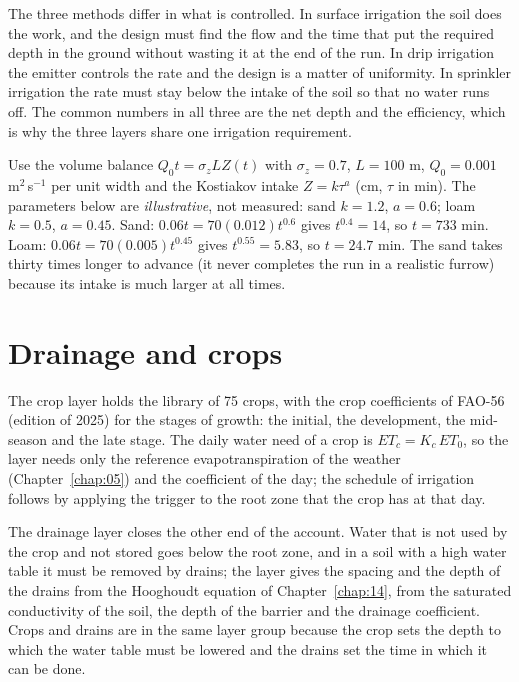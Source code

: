 The three methods differ in what is controlled. In surface irrigation the soil does the work, and the design must find the flow and the time that put the required depth in the ground without wasting it at the end of the run. In drip irrigation the emitter controls the rate and the design is a matter of uniformity. In sprinkler irrigation the rate must stay below the intake of the soil so that no water runs off. The common numbers in all three are the net depth and the efficiency, which is why the three layers share one irrigation requirement.

\sol  Use the volume balance $Q_0t=\sigma_zLZ(t)$ with $\sigma_z=0.7$, $L=100$ m, $Q_0=0.001$ m$^2$\,s$^{-1}$ per unit width and the Kostiakov intake $Z=k\tau^a$ (cm, $\tau$ in min). The parameters below are \emph{illustrative}, not measured: sand $k=1.2$, $a=0.6$; loam $k=0.5$, $a=0.45$. Sand: $0.06t=70(0.012)t^{0.6}$ gives $t^{0.4}=14$, so $t=733$ min. Loam: $0.06t=70(0.005)t^{0.45}$ gives $t^{0.55}=5.83$, so $t=24.7$ min. The sand takes thirty times longer to advance (it never completes the run in a realistic furrow) because its intake is much larger at all times. \finans


\section{Drainage and crops}
The crop layer holds the library of 75 crops, with the crop coefficients of FAO-56 (edition of 2025) for the stages of growth: the initial, the development, the mid-season and the late stage. The daily water need of a crop is $ET_c=K_c\,ET_0$, so the layer needs only the reference evapotranspiration of the weather (Chapter~\ref{chap:05}) and the coefficient of the day; the schedule of irrigation follows by applying the trigger to the root zone that the crop has at that day.

The drainage layer closes the other end of the account. Water that is not used by the crop and not stored goes below the root zone, and in a soil with a high water table it must be removed by drains; the layer gives the spacing and the depth of the drains from the Hooghoudt equation of Chapter~\ref{chap:14}, from the saturated conductivity of the soil, the depth of the barrier and the drainage coefficient. Crops and drains are in the same layer group because the crop sets the depth to which the water table must be lowered and the drains set the time in which it can be done.

